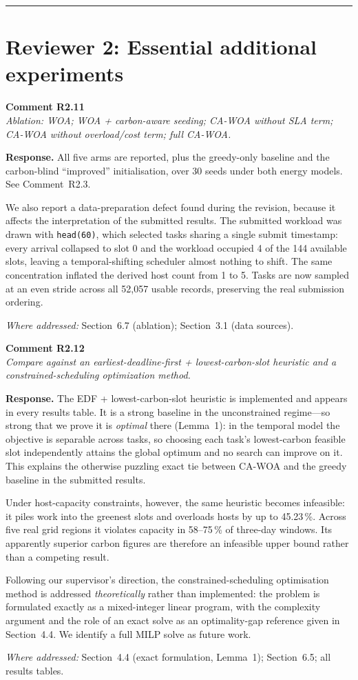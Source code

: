 \documentclass[11pt,a4paper]{article}
\newcommand{\rsp}[1]{\vspace{2pt}\noindent\textbf{Response.} #1\par\vspace{6pt}}
\newcommand{\rwhere}[1]{\noindent\textit{Where addressed:} #1\par\vspace{10pt}}
\newenvironment{revcomment}[1]
  {\begin{tcolorbox}[colback=gray!6,colframe=gray!45,boxrule=0.4pt,
     left=6pt,right=6pt,top=4pt,bottom=4pt]\textbf{#1}\\[2pt]\itshape\color{cmt}}
  {\end{tcolorbox}\vspace{4pt}}
\begin{document}
\bigskip
\hrule
\bigskip

\section{Reviewer 2: Essential additional experiments}

\begin{revcomment}{Comment R2.11}
Ablation: WOA; WOA + carbon-aware seeding; CA-WOA without SLA term; CA-WOA without
overload/cost term; full CA-WOA.
\end{revcomment}
\rsp{All five arms are reported, plus the greedy-only baseline and the carbon-blind
``improved'' initialisation, over 30 seeds under both energy models. See
Comment~R2.3.

We also report a data-preparation defect found during the revision, because it
affects the interpretation of the submitted results. The submitted workload was
drawn with \texttt{head(60)}, which selected tasks sharing a single submit
timestamp: every arrival collapsed to slot 0 and the workload occupied 4 of the 144
available slots, leaving a temporal-shifting scheduler almost nothing to shift.
The same concentration inflated the derived host count from 1 to 5. Tasks are now
sampled at an even stride across all 52{,}057 usable records, preserving the real
submission ordering.}
\rwhere{Section~6.7 (ablation); Section~3.1 (data sources).}

\begin{revcomment}{Comment R2.12}
Compare against an earliest-deadline-first + lowest-carbon-slot heuristic and a
constrained-scheduling optimization method.
\end{revcomment}
\rsp{The EDF + lowest-carbon-slot heuristic is implemented and appears in every
results table. It is a strong baseline in the unconstrained regime---so strong that
we prove it is \emph{optimal} there (Lemma~1): in the temporal model the objective
is separable across tasks, so choosing each task's lowest-carbon feasible slot
independently attains the global optimum and no search can improve on it. This
explains the otherwise puzzling exact tie between CA-WOA and the greedy baseline
in the submitted results.

Under host-capacity constraints, however, the same heuristic becomes infeasible: it
piles work into the greenest slots and overloads hosts by up to 45.23\,\%. Across
five real grid regions it violates capacity in 58--75\,\% of three-day windows.
Its apparently superior carbon figures are therefore an infeasible upper bound
rather than a competing result.

Following our supervisor's direction, the constrained-scheduling optimisation
method is addressed \emph{theoretically} rather than implemented: the problem is
formulated exactly as a mixed-integer linear program, with the complexity argument
and the role of an exact solve as an optimality-gap reference given in
Section~4.4. We identify a full MILP solve as future work.}
\rwhere{Section~4.4 (exact formulation, Lemma~1); Section~6.5; all results tables.}
\end{document}
